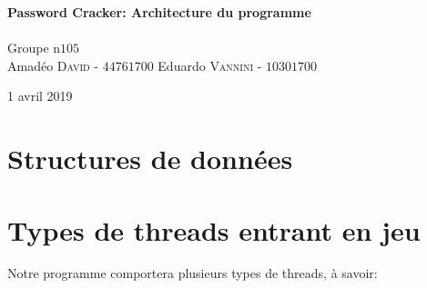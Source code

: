 \documentclass{article}
\begin{document}
\begin{titlepage}
	{\huge\bfseries Password Cracker: Architecture du programme}\\[0.4cm] %
	
	\HRule\\[1.5cm]
	
	
	Groupe n\degree$105$\\[0.2cm]
	Amadéo \textsc{David}  - $44761700$%
	Eduardo \textsc{Vannini} - $10301700$%
	
	
	\vfill\vfill\vfill %
	
	{\large 1\ier{} avril 2019} %
	
	
	\vfill %
	
\end{titlepage}


\section{Structures de données}
\label{sec:data_structures}

\section{Types de threads entrant en jeu}
	
	\noindent
	Notre programme comportera plusieurs types de threads, à savoir:
	
\end{document}
